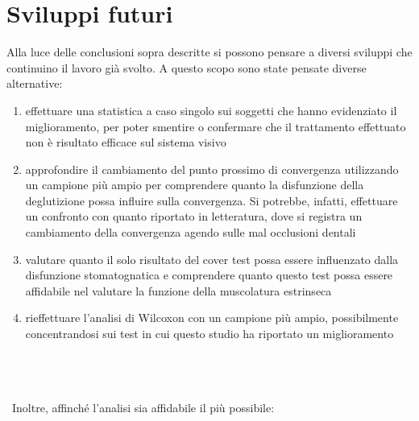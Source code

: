 \section{Sviluppi futuri}

Alla luce delle conclusioni sopra descritte si possono pensare a diversi sviluppi che continuino il lavoro già svolto. A questo scopo sono state pensate diverse alternative:
\begin{enumerate}
\item effettuare una statistica a caso singolo sui soggetti che hanno evidenziato il miglioramento, per poter smentire o confermare che il trattamento effettuato non è risultato efficace sul sistema visivo
\item approfondire il cambiamento del punto prossimo di convergenza utilizzando un campione più ampio per comprendere quanto la disfunzione della deglutizione possa influire sulla convergenza. Si potrebbe, infatti, effettuare un confronto con quanto riportato in letteratura, dove si registra un cambiamento della convergenza agendo sulle mal occlusioni dentali
\item valutare quanto il solo risultato del cover test possa essere influenzato dalla disfunzione stomatognatica e comprendere quanto questo test possa essere affidabile nel valutare la funzione della muscolatura estrinseca
\item rieffettuare l’analisi di Wilcoxon con un campione più ampio, possibilmente concentrandosi sui test in cui questo studio ha riportato un miglioramento
\end{enumerate}
\\\ \\\ \\\
Inoltre, affinché l’analisi sia affidabile il più possibile:
